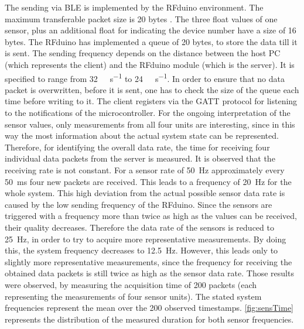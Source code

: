 The sending via BLE is implemented by the RFduino environment. The maximum transferable packet size is 20 bytes \cite{rfduino2015data}. The three float values of one sensor, plus an additional float for indicating the device number have a size of 16 bytes. The RFduino has implemented a queue of 20 bytes, to store the data till it is sent. The sending frequency depends on the distance between the host PC (which represents the client) and the RFduino module (which is the server). It is specified to range from \SI[per-mode=symbol]{32}{\kilo \bit \per \second} to \SI[per-mode=symbol]{24}{\kilo \bit \per \second}. In order to ensure that no data packet is overwritten, before it is sent, one has to check the size of the queue each time before writing to it. The client registers via the \ac{GATT} protocol for listening to the notifications of the microcontroller. For the ongoing interpretation of the sensor values, only measurements from all four units are interesting, since in this way the most information about the actual system state can be represented. Therefore, for identifying the overall data rate, the time for receiving four individual data packets from the server is measured. It is observed that the receiving rate is not constant. For a sensor rate of \SI{50}{\Hz} approximately every \SI{50}{\ms} four new packets are received. This leads to a frequency of \SI{20}{\Hz} for the whole system. This high deviation from the actual possible sensor data rate is caused by the low sending frequency of the RFduino. Since the sensors are triggered with a frequency more than twice as high as the values can be received, their quality decreases. Therefore the data rate of the sensors is reduced to \SI{25}{\Hz}, in order to try to acquire more representative measurements. By doing this, the system frequency decreases to \SI{12.5}{\Hz}. However, this leads only to slightly more representative measurements, since the frequency for receiving the obtained data packets is still twice as high as the sensor data rate. Those results were observed, by measuring the acquisition time of 200 packets (each representing the measurements of four sensor units). The stated system frequencies represent the mean over the 200 observed timestamps. \ref{fig:sensTime} represents the distribution of the measured duration for both sensor frequencies.
